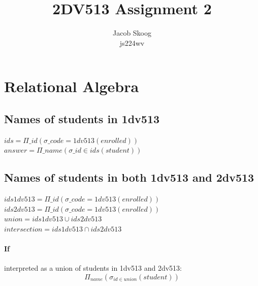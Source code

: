 \documentclass[12pt]{article}
\title{2DV513 Assignment 2}
\author{Jacob Skoog \\ js224wv}
\begin{document}
\begin{titlepage}
\maketitle
\end{titlepage}

\section {Relational Algebra}\label{sec:relational-algebra}

\subsection {Names of students in 1dv513}\label{subsec:names-of-students-in-1dv513}
\begin {math}
ids = \Pi\_{id}(\sigma\_{code=1dv513}(enrolled))
\end {math}
\\
\begin {math}
answer = \Pi\_{name}(\sigma\_{id \in ids}(student))
\end {math}

\subsection {Names of students in both 1dv513 and 2dv513}\label{subsec:names-of-students-in-both-1dv513-and-2dv513}
\begin {math}
ids1dv513 = \Pi\_{id}(\sigma\_{code=1dv513}(enrolled))
\end {math}
\\
\begin {math}
ids2dv513 = \Pi\_{id}(\sigma\_{code=1dv513}(enrolled))
\end {math}
\\
\begin {math}
union = ids1dv513 \cup ids2dv513
\end {math}
\\
\begin {math}
intersection = ids1dv513 \cap ids2dv513
\end {math}

\paragraph{If} interpreted as a union of students in 1dv513 and 2dv513:
\begin {equation}
\Pi_{name}(\sigma_{id \in union}(student))\label{eq:equation1}
\end {equation}
\end{document}
